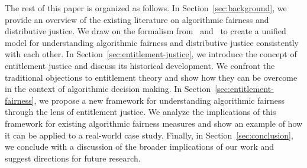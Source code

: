 The rest of this paper is organized as follows. In Section~\ref{sec:background},
we provide an overview of the existing literature on algorithmic fairness and
distributive justice. We draw on the formalism from~\cite{Kuppler_2021}
and~\cite{CorbettDavies_2023} to create a unified model for understanding
algorithmic fairness and distributive justice consistently with each other. 
In Section~\ref{sec:entitlement-justice}, we introduce the concept of
entitlement justice and discuss its historical development. We confront the 
traditional objections to entitlement theory and show how they can be overcome
in the context of algorithmic decision making. In
Section~\ref{sec:entitlement-fairness}, we propose a new framework for
understanding algorithmic fairness through the lens of entitlement justice. We
analyze the implications of this framework for existing algorithmic fairness
measures and show an example of how it can be applied to a real-world case
study. Finally, in Section~\ref{sec:conclusion}, we conclude with a discussion
of the broader implications of our work and suggest directions for future
research.
